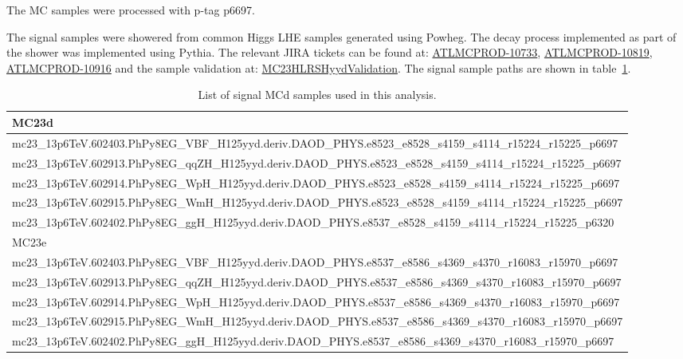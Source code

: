 The MC samples were processed with p-tag p6697.

The signal samples were showered from common Higgs LHE samples generated using Powheg. The decay process implemented as part of the shower was implemented using Pythia. The relevant JIRA tickets can be found at: \href{https://its.cern.ch/jira/browse/ATLMCPROD-10773}{ATLMCPROD-10733}, \href{https://its.cern.ch/jira/browse/ATLMCPROD-10819}{ATLMCPROD-10819}, \href{https://its.cern.ch/jira/browse/ATLMCPROD-10916}{ATLMCPROD-10916} and the sample validation at: \href{https://twiki.cern.ch/twiki/bin/view/AtlasProtected/MC23HLRSHyydValidation}{MC23HLRSHyydValidation}. The signal sample paths are shown in table~\ref{tab:signal-samples}. 

\begin{table}[ht]
\centering
\scriptsize
\caption{List of signal MCd samples used in this analysis.}
\label{tab:signal-samples}
\begin{tabular}{l}
\toprule
MC23d \\
\midrule
mc23\_13p6TeV.602403.PhPy8EG\_VBF\_H125yyd.deriv.DAOD\_PHYS.e8523\_e8528\_s4159\_s4114\_r15224\_r15225\_p6697\\
mc23\_13p6TeV.602913.PhPy8EG\_qqZH\_H125yyd.deriv.DAOD\_PHYS.e8523\_e8528\_s4159\_s4114\_r15224\_r15225\_p6697\\
mc23\_13p6TeV.602914.PhPy8EG\_WpH\_H125yyd.deriv.DAOD\_PHYS.e8523\_e8528\_s4159\_s4114\_r15224\_r15225\_p6697\\
mc23\_13p6TeV.602915.PhPy8EG\_WmH\_H125yyd.deriv.DAOD\_PHYS.e8523\_e8528\_s4159\_s4114\_r15224\_r15225\_p6697\\
mc23\_13p6TeV.602402.PhPy8EG\_ggH\_H125yyd.deriv.DAOD\_PHYS.e8537\_e8528\_s4159\_s4114\_r15224\_r15225\_p6320\\
\midrule
MC23e \\
mc23\_13p6TeV.602403.PhPy8EG\_VBF\_H125yyd.deriv.DAOD\_PHYS.e8537\_e8586\_s4369\_s4370\_r16083\_r15970\_p6697\\
mc23\_13p6TeV.602913.PhPy8EG\_qqZH\_H125yyd.deriv.DAOD\_PHYS.e8537\_e8586\_s4369\_s4370\_r16083\_r15970\_p6697\\
mc23\_13p6TeV.602914.PhPy8EG\_WpH\_H125yyd.deriv.DAOD\_PHYS.e8537\_e8586\_s4369\_s4370\_r16083\_r15970\_p6697\\
mc23\_13p6TeV.602915.PhPy8EG\_WmH\_H125yyd.deriv.DAOD\_PHYS.e8537\_e8586\_s4369\_s4370\_r16083\_r15970\_p6697\\
mc23\_13p6TeV.602402.PhPy8EG\_ggH\_H125yyd.deriv.DAOD\_PHYS.e8537\_e8586\_s4369\_s4370\_r16083\_r15970\_p6697\\
\midrule
\bottomrule
\end{tabular}
\end{table}

